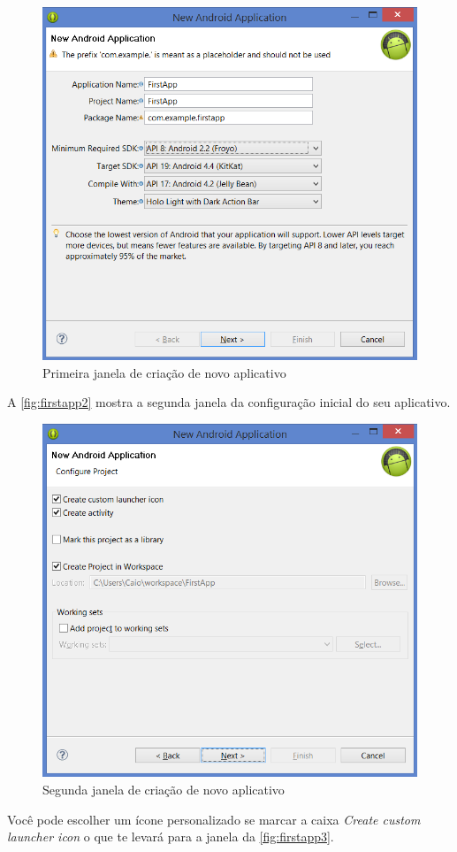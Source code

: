 \documentclass[a4paper,12pt,brazil,oneside]{book}
\begin{document}
\begin{singlespace}
\begin{figure}[H]
  \centering
  \includegraphics[width=.75\textwidth]{figuras/firstapp/firstapp1.png}
  \caption{Primeira janela de criação de novo aplicativo}
  \label{fig:firstapp1}
\end{figure}


A \autoref{fig:firstapp2} mostra a segunda janela da configuração inicial do seu aplicativo. 

\begin{figure}[H]
  \centering
  \includegraphics[width=.75\textwidth]{figuras/firstapp/firstapp2.png}
  \caption{Segunda janela de criação de novo aplicativo}
  \label{fig:firstapp2}
\end{figure}


Você pode escolher um ícone personalizado se marcar a caixa \emph{Create custom launcher icon} o que te levará para a janela da \autoref{fig:firstapp3}. 


\end{singlespace}
\end{document}
